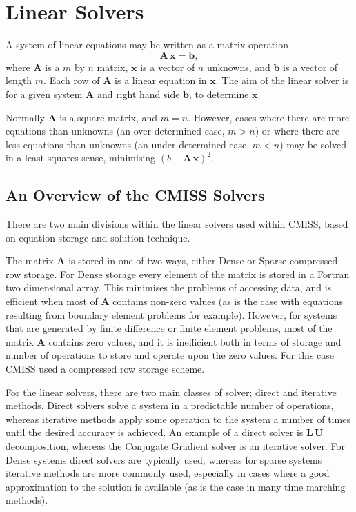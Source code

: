 
\section{Linear Solvers}\label{s1.0}

A system of linear equations may be written as a matrix operation
\begin{equation}\label{e1.0}
\mathbf{A \, x = b},
\end{equation}
where $\mathbf{A}$ is a $m$ by $n$ matrix, 
$\mathbf{x}$ is a vector of $n$ unknowns,
and $\mathbf{b}$ is a vector of length $m$. 
Each row of $\mathbf{A}$ is a linear equation in $\mathbf{x}$. 
The aim of the linear solver is for a given system $\mathbf{A}$ and
right hand side $\mathbf{b}$, to determine $\mathbf{x}$.

Normally $\mathbf{A}$ is a square matrix, and $m = n$. However, cases
where there are more equations than unknowns (an over-determined case, $m > n$)
or where there are less equations than unknowns (an under-determined case, 
$m < n$) may be solved in a least squares sense, minimising 
$(b - \mathbf{A \, x})^2$.

\subsection{An Overview of the CMISS Solvers}\label{s1.1}

There are two main divisions within the linear solvers used within CMISS, 
based on equation storage and solution technique.

The matrix $\mathbf{A}$ is stored in one of two ways, either Dense or Sparse
compressed row storage. For Dense storage every element of the matrix is 
stored in a Fortran two dimensional array. This minimises the problems
of accessing data, and is efficient when most of $\mathbf{A}$ contains non-zero 
values (as is the case with equations resulting from boundary element problems
for example). However, for systems that are generated by finite difference or 
finite element problems, most of the matrix $\mathbf{A}$ contains zero values,
and it is inefficient both in terms of storage and number of operations to
store and operate upon the zero values. For this case CMISS used a compressed 
row storage scheme.

For the linear solvers, there are two main classes of solver; direct and 
iterative methods. Direct solvers solve a system in a predictable number of 
operations, whereas iterative methods apply some operation to the system
a number of times until the desired accuracy is achieved. An example of
a direct solver is $\mathbf{L \, U}$ decomposition, whereas the Conjugate 
Gradient solver is an iterative solver. For Dense systems direct solvers are 
typically used, whereas for sparse systems iterative methods are more commonly 
used, especially in cases where a good approximation to the solution is 
available (as is the case in many time marching methods).


